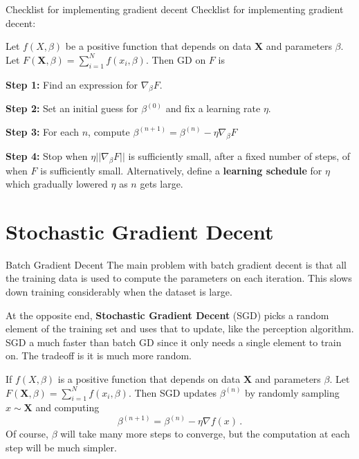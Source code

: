 \documentclass[10pt, table, dvipsnames,xcdraw, handout]{beamer}
\begin{document}
\begin{frame}[fragile]{Checklist for implementing gradient decent}
Checklist for implementing gradient decent:

Let $f(X, \beta)$ be a positive function that depends on data $\mathbf{X}$ and parameters $\beta$. Let $F(\mathbf{X},\beta) = \sum_{i=1}^N f(x_i, \beta)$. Then GD on $F$ is

\textbf{Step 1:} Find an expression for $\nabla_\beta F$. 

\textbf{Step 2:} Set an initial guess for $\beta^{(0)}$ and fix a learning rate $\eta$. 

\textbf{Step 3:} For each $n$, compute $\beta^{(n+1)} = \beta^{(n)} - \eta \nabla_\beta F$

\textbf{Step 4:} Stop when $\eta ||\nabla_\beta F||$ is sufficiently small, after a fixed number of steps, of when $F$ is sufficiently small. Alternatively, define a \textbf{learning schedule} for $\eta$ which gradually lowered $\eta$ as $n$ gets large. 
\end{frame}




\section{Stochastic Gradient Decent}

\begin{frame}[fragile]{Batch Gradient Decent}
The main problem with batch gradient decent is that all the training data is used to compute the parameters on each iteration. This slows down training considerably when the dataset is large. \pause

At the opposite end, \textbf{Stochastic Gradient Decent} (SGD) picks a random element of the training set and uses that to update, like the perception algorithm. SGD a much faster than batch GD since it only needs a single element to train on. The tradeoff is it is much more random.\pause

If $f(X, \beta)$ is a positive function that depends on data $\mathbf{X}$ and parameters $\beta$. Let $F(\mathbf{X},\beta) = \sum_{i=1}^N f(x_i, \beta)$. Then SGD updates $\beta^{(n)}$ by randomly sampling $x\sim \mathbf{X}$ and computing
$$
\beta^{(n+1)} = \beta^{(n)} - \eta\nabla f(x)\,. 
$$
Of course, $\beta$ will take many more steps to converge, but the computation at each step will be much simpler. 
\end{frame}
\end{document}
